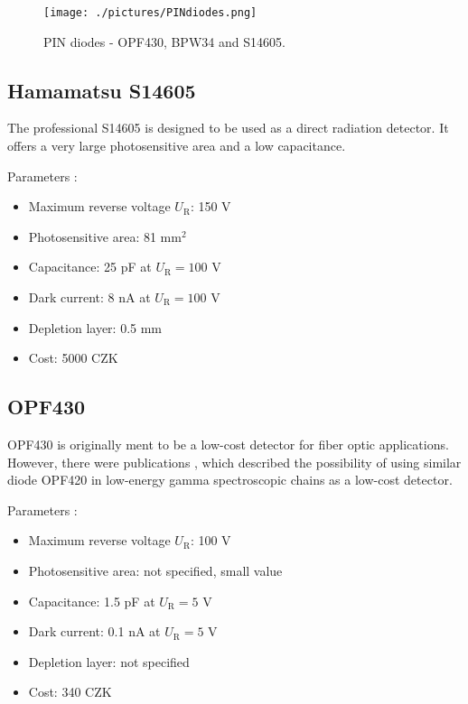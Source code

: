 \begin{figure}[H]
 \centering
 \texttt{[image: ./pictures/PINdiodes.png]}
 \caption{PIN diodes - OPF430, BPW34 and S14605.}
 \label{PIN diodes}

\end{figure}

\subsection{Hamamatsu S14605}
The professional S14605 is designed to be used as a direct radiation detector. It offers a very large photosensitive area and a low capacitance.

Parameters \cite{datS14605}:
\begin{itemize}
\item Maximum reverse voltage $U_\textrm{R}$: 150 V
\item Photosensitive area: 81 mm$^2$
\item Capacitance: 25 pF at $U_\textrm{R} = 100$ V
\item Dark current: 8 nA at $U_\textrm{R} = 100$ V
\item Depletion layer: 0.5 mm
\item Cost: 5000 CZK
\end{itemize}

% 

\subsection{OPF430}
OPF430 is originally ment to be a low-cost detector for fiber optic applications. However, there were publications \cite{RAMIREZJIMENEZ2003577}, which described the possibility of using similar diode OPF420 in low-energy gamma spectroscopic chains as a low-cost detector.

Parameters \cite{datOPF430}:
\begin{itemize}
\item Maximum reverse voltage $U_\textrm{R}$: 100 V
\item Photosensitive area: not specified, small value
\item Capacitance: 1.5  pF at $U_\textrm{R} = 5$ V
\item Dark current: 0.1 nA at $U_\textrm{R} = 5$ V
\item Depletion layer: not specified
\item Cost: 340 CZK
\end{itemize}

